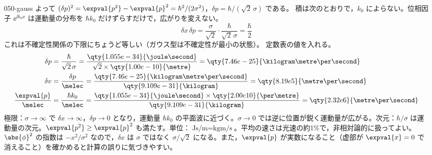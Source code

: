 \documentclass[uplatex,dvipdfmx,a4paper,11pt]{jsarticle}
\begin{document}
\begin{kaisetsu}{050-gauss}
よって $(\delta p)^{2}=\expval{p^{2}}-\expval{p}^{2}=\hbar^{2}/(2\sigma^{2})$，$\delta p=\hbar/(\sqrt{2}\,\sigma)$ である。
 積は次のとおりで，$k_{0}$ によらない。位相因子 $\ee^{\ii k_{0}x}$ は運動量の分布を $\hbar k_{0}$ だけずらすだけで，広がりを変えない。
\[ \delta x\,\delta p=\frac{\sigma}{\sqrt{2}}\cdot\frac{\hbar}{\sqrt{2}\,\sigma}=\frac{\hbar}{2} \]
これは不確定性関係の下限にちょうど等しい（ガウス型は不確定性が最小の状態）。
 定数表の値を入れる。
\begin{align*}
\delta p&=\frac{\hbar}{\sqrt{2}\,\sigma}=\frac{\qty{1.055e-34}{\joule\second}}{\sqrt{2}\times\qty{1.00e-10}{\metre}}=\qty{7.46e-25}{\kilogram\metre\per\second}\\
\delta v&=\frac{\delta p}{\melec}=\frac{\qty{7.46e-25}{\kilogram\metre\per\second}}{\qty{9.109e-31}{\kilogram}}=\qty{8.19e5}{\metre\per\second}\\
\frac{\expval{p}}{\melec}&=\frac{\hbar k_{0}}{\melec}=\frac{\qty{1.055e-34}{\joule\second}\times\qty{2.00e10}{\per\metre}}{\qty{9.109e-31}{\kilogram}}=\qty{2.32e6}{\metre\per\second}
\end{align*}
\kenzan 極限：$\sigma\to\infty$ で $\delta x\to\infty$，$\delta p\to 0$ となり，運動量 $\hbar k_{0}$ の平面波に近づく。$\sigma\to 0$ では逆に位置が鋭く運動量が広がる。次元：$\hbar/\sigma$ は運動量の次元。$\expval{p^{2}}\ge\expval{p}^{2}$ も満たす。単位：$\unit{\joule\second\per\metre}=\unit{\kilogram\metre\per\second}$。平均の速さは光速の約1\%で，非相対論的に扱ってよい。
\tsumazuki $\abs{\phi}^{2}$ の指数は $-x^{2}/\sigma^{2}$ なので，$\delta x$ は $\sigma$ ではなく $\sigma/\sqrt{2}$ になる。また，$\expval{p}$ が実数になること（虚部が $\expval{x}=0$ で消えること）を確かめると計算の誤りに気づきやすい。
\end{kaisetsu}
\end{document}
